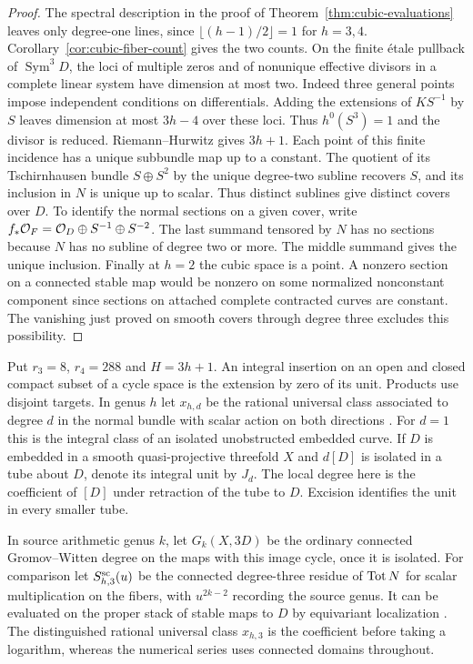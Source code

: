 \begin{proof}
The spectral description in the proof of Theorem~\ref{thm:cubic-evaluations}
leaves only degree-one lines, since $\lfloor(h-1)/2\rfloor=1$ for
$h=3,4$. Corollary~\ref{cor:cubic-fiber-count} gives the two counts.
On the finite \'etale pullback of $\operatorname{Sym}^3D$, the loci of
multiple zeros and of nonunique effective divisors in a complete
linear system have dimension at most two. Indeed three general points
impose independent conditions on differentials. Adding the extensions
of $KS^{-1}$ by $S$ leaves dimension at most $3h-4$ over these loci.
Thus $h^0(S^3)=1$ and the divisor is reduced. Riemann--Hurwitz gives
$3h+1$. Each point of this finite incidence has a unique subbundle map
up to a constant. The quotient of its Tschirnhausen bundle $S\oplus S^2$ by the unique
degree-two subline recovers $S$, and its inclusion in $N$ is unique up
to scalar. Thus distinct sublines give distinct covers over $D$.
To identify the normal sections on a given cover, write $f_*\mathcal O_F=\mathcal O_D\oplus S^{-1}\oplus S^{-2}$. The last summand
tensored by $N$ has no sections because $N$ has no subline of degree
two or more. The middle summand gives the unique inclusion. Finally at
$h=2$ the cubic space is a point. A nonzero section on a connected
stable map would be nonzero on some normalized nonconstant component
since sections on attached complete contracted curves are constant.
The vanishing just proved on smooth covers through degree three
excludes this possibility.
\end{proof}
Put $r_3=8$, $r_4=288$ and $H=3h+1$.
An integral insertion on an open and closed compact subset of a
cycle space is the extension by zero of its unit. Products use disjoint
targets. In genus $h$ let $x_{h,d}$ be the rational universal class
associated to degree $d$ in the normal bundle with scalar action on
both directions \cite[Definition 4.7]{Pardon}. For $d=1$ this is
the integral class of an isolated unobstructed embedded curve.
If $D$ is embedded in a smooth quasi-projective threefold $X$ and
$d[D]$ is isolated in a tube about $D$, denote its integral unit
by $J_d$. The local degree here is the coefficient of $[D]$ under
retraction of the tube to $D$. Excision identifies the unit in
every smaller tube.

In source arithmetic genus $k$, let $G_k(X,3D)$ be the ordinary
connected Gromov--Witten degree on the maps with this image cycle,
once it is isolated. For comparison let $S^{\rm sc}_{h,3}(u)$ be the
connected degree-three residue of $\operatorname{Tot} N$ for scalar multiplication
on the fibers, with $u^{2k-2}$ recording the source genus. It can be
evaluated on the proper stack of stable maps to $D$ by equivariant
localization \cite{BP}. The distinguished rational universal class
$x_{h,3}$ is the coefficient before taking a logarithm, whereas the
numerical series uses connected domains throughout.


